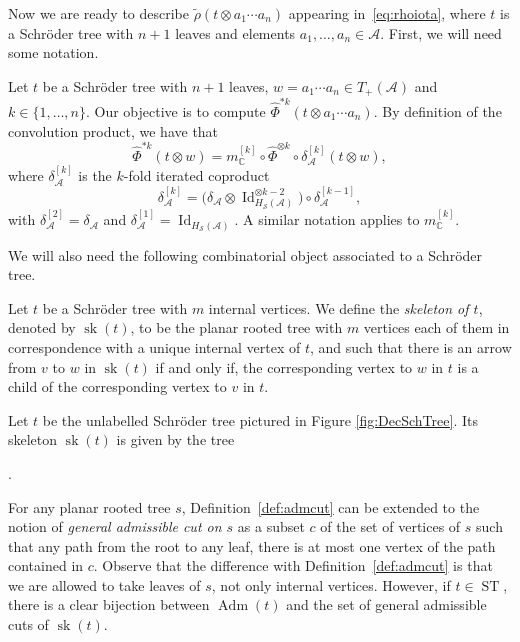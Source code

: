 \documentclass[11pt]{article}
\numberwithin{equation}{section}
\numberwithin{equation}{section}
\newcommand{\Id}{\operatorname{Id}}
\newcommand{\A}{\mathcal{A}}
\newcommand{\ST}{\operatorname{ST}}
\newcommand{\cHS}{H_\mathcal{S}}
\newcommand{\sk}{\operatorname{sk}}
\begin{document}
Now we are ready to describe $\tilde\rho(t\otimes a_1\cdots a_n)$ appearing in~\eqref{eq:rhoiota}, where $t$ is a Schr\"oder tree with $n+1$ leaves and elements $a_1,\dots, a_n\in \A$. First, we will need some notation.

Let $t$ be a Schr\"oder tree with $n+1$ leaves, $w=a_1\cdots a_n\in T_+(\A)$ and $k \in \{1,\dots, n\}$. Our objective is to compute $\hat\Phi^{*k}(t\otimes a_1\cdots a_n)$. By definition of the convolution product, we have that
\begin{equation}
\label{eq:iterated}
	\hat\Phi^{*k}(t\otimes w) = m_{\mathbb{C}}^{[k]} \circ \hat\Phi^{\otimes k}\circ \delta_\A^{[k]}(t\otimes w),
\end{equation}
where $\delta_\A^{[k]}$ is the $k$-fold iterated coproduct
\[
	\delta_\A^{[k]} = \big(\delta_\A \otimes \Id_{\cHS(\A)}^{\otimes k-2}\big)\circ \delta_{\A}^{[k-1]},
\]
with $\delta_\A^{[2]} = \delta_\A$ and $\delta_\A^{[1]} = \Id_{\cHS(\A)}$. A similar notation applies to $m_{\mathbb{C}}^{[k]}$.

 We will also need the following combinatorial object associated to a Schr\"oder tree.

\begin{Definition}
Let $t$ be a Schr\"oder tree with $m$ internal vertices. We define the \textit{skeleton of $t$}, denoted by $\sk(t)$, to be the planar rooted tree with $m$ vertices each of them in correspondence with a unique internal vertex of $t$, and such that there is an arrow from $v$ to $w$ in $\sk(t)$ if and only if, the corresponding vertex to $w$ in $t$ is a child of the corresponding vertex to $v$ in $t$.
\end{Definition}

\begin{Example}
Let $t$ be the unlabelled Schr\"oder tree pictured in Figure \ref{fig:DecSchTree}. Its skeleton $\sk(t)$ is given by the tree
.
\end{Example}

\begin{Remark}\label{rem:generalcuts}For any planar rooted tree $s$, Definition~\ref{def:admcut} can be extended to the notion of \textit{general admissible cut on $s$} as a subset $c$ of the set of vertices of $s$ such that any path from the root to any leaf, there is at most one vertex of the path contained in $c$. Observe that the difference with Definition~\ref{def:admcut} is that we are allowed to take leaves of $s$, not only internal vertices. However, if $t\in \ST$, there is a clear bijection between $\operatorname{Adm}(t)$ and the set of general admissible cuts of $\sk(t)$.
\end{Remark}
\end{document}
